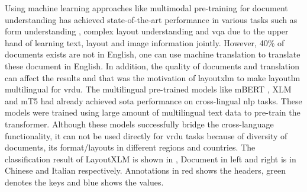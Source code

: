Using machine learning approaches like multimodal pre-training for document understanding has achieved state-of-the-art performance in various tasks such as form understanding \cite{jaume2019funsd}, complex layout understanding \cite{gralinski2020kleister} and \acrfull{vqa} \cite{mathew2021docvqa} due to the upper hand of learning text, layout and image information jointly. However, 40\% of documents exists are not in English, one can use machine translation to translate these document in English. In addition, the quality of documents and translation can affect the results and that was the motivation of layoutxlm \cite{xu2021layoutxlm} to make layoutlm\cite{xu2020layoutlm} multilingual for \acrfull{vrdu}. The multilingual pre-trained models like mBERT \cite{devlin2018bert}, XLM \cite{lample2019cross} and mT5 \cite{xue2020mt5} had already achieved \acrshort{sota} performance on cross-lingual \acrshort{nlp} tasks. These models were trained using large amount of multilingual text data to pre-train the transformer. Although these models successfully bridge the cross-language functionality, it can not be used directly for \acrshort{vrdu} tasks because of diversity of documents, its format/layouts in different regions and countries. The classification result of LayoutXLM is shown in , Document in left and right is in Chinese and Italian respectively. Annotations in red shows the headers, green denotes the keys and blue shows the values. 

